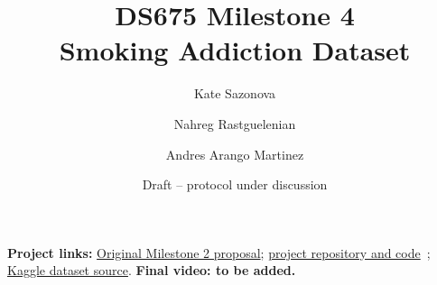 \documentclass[11pt,letterpaper]{article}
\title{DS675 Milestone 4\\Smoking Addiction Dataset}
\author{Kate Sazonova \and Nahreg Rastguelenian \and Andres Arango Martinez}
\date{Draft -- protocol under discussion}
\newcommand{\repourl}{https://github.com/Andres-ArangoMartinez/DS675---Smoking-Addiction-Dataset}
\newcommand{\dataseturl}{https://www.kaggle.com/datasets/datascikhan/the-nicotine-craving-and-anxiety-dynamics-dataset/data}
\newcommand{\proposalurl}{https://github.com/Andres-ArangoMartinez/DS675---Smoking-Addiction-Dataset/blob/main/Smoking\%20Addiction\%20Dataset\%20Sazonova_Milestone\%202.pdf}
\begin{document}
\maketitle

\noindent\textbf{Project links:}
\href{\proposalurl}{Original Milestone 2 proposal};
\href{\repourl}{project repository and code}~\cite{repository};
\href{\dataseturl}{Kaggle dataset source}.
\textbf{Final video: to be added.}








\begingroup
\raggedright


\endgroup
\end{document}

